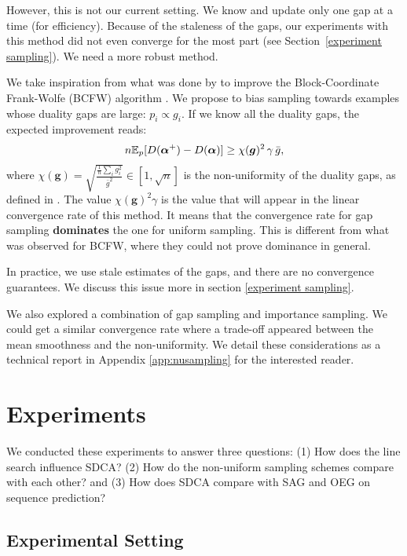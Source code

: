 However, this is not our current setting.
We know and update only one gap at a time (for efficiency).
Because of the staleness of the gaps, our experiments with this method did not even converge for the most part (see Section~\ref{experiment sampling}).
We need a more robust method.

We take inspiration from what was done by \citet{osokin2016minding} to improve the Block-Coordinate Frank-Wolfe (BCFW) algorithm \citep{lacoste2013block}.
We propose to bias sampling towards examples whose duality gaps are large: $p_i \propto g_i$.
If we know all the duality gaps, the expected improvement reads:
\begin{equation}
	n \mathbb E_p[D(\boldsymbol{\alpha}^+) - D(\boldsymbol{\alpha})]
	\geq \chi(\bm g)^2 \, \gamma \, \bar g,
\end{equation}
where $	\chi(\bm g) = \sqrt{ \frac{ \frac{1}{n} \sum_i g_i^2}{\bar g^2} } \in [1, \sqrt n] $ is the non-uniformity of the duality gaps, as defined in \citet[Section 3.1]{osokin2016minding}.
The value $\chi(\bm g)^2 \gamma$ is the value that will appear in the linear convergence rate of this method.
It means that the convergence rate for gap sampling \textbf{dominates} the one for uniform sampling.
This is different from what was observed for  BCFW, where they could not prove dominance in general.

In practice, we use stale estimates of the gaps, and there are no convergence guarantees.
We discuss this issue more in section \ref{experiment sampling}.

We also explored a combination of gap sampling and importance sampling.
We could get a similar convergence rate where a trade-off appeared between the mean smoothness and the non-uniformity.
We detail these considerations as a technical report in Appendix \ref{app:nusampling} for the interested reader.

\section{Experiments} \label{sec:experiments}
We conducted these experiments to answer three questions:
(1) How does the line search influence SDCA?
(2) How do the non-uniform sampling schemes compare with each other?
and (3) How does SDCA compare with SAG and OEG on sequence prediction?

\subsection{Experimental Setting}


